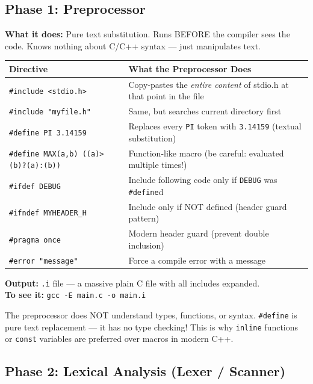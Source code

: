 \documentclass[11pt,a4paper]{article}
\newcommand{\code}[1]{\texttt{\small\colorbox{codebg}{\color{codekw}#1}}}
\begin{document}
\subsection{Phase 1: Preprocessor}

\textbf{What it does:} Pure text substitution. Runs BEFORE the compiler sees the code. Knows nothing about C/C++ syntax --- just manipulates text.

\begin{center}
\begin{tabular}{L{4.5cm} L{9cm}}
\toprule
\textbf{Directive} & \textbf{What the Preprocessor Does} \\
\midrule
\code{\#include <stdio.h>} & Copy-pastes the \textit{entire content} of stdio.h at that point in the file \\
\code{\#include "myfile.h"} & Same, but searches current directory first \\
\code{\#define PI 3.14159} & Replaces every \code{PI} token with \code{3.14159} (textual substitution) \\
\code{\#define MAX(a,b) ((a)>(b)?(a):(b))} & Function-like macro (be careful: evaluated multiple times!) \\
\code{\#ifdef DEBUG} & Include following code only if \code{DEBUG} was \code{\#define}d \\
\code{\#ifndef MYHEADER\_H} & Include only if NOT defined (header guard pattern) \\
\code{\#pragma once} & Modern header guard (prevent double inclusion) \\
\code{\#error "message"} & Force a compile error with a message \\
\bottomrule
\end{tabular}
\end{center}

\textbf{Output:} \texttt{.i} file --- a massive plain C file with all includes expanded.\\
\textbf{To see it:} \lstinline[style=bashstyle]{gcc -E main.c -o main.i}

\begin{mcqtrap}
The preprocessor does NOT understand types, functions, or syntax. \code{\#define} is pure text replacement --- it has no type checking! This is why \code{inline} functions or \code{const} variables are preferred over macros in modern C++.
\end{mcqtrap}

\subsection{Phase 2: Lexical Analysis (Lexer / Scanner)}
\end{document}
